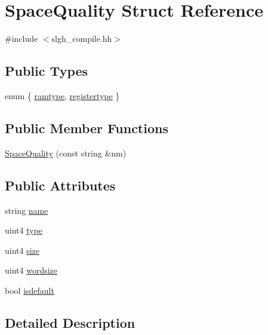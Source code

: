 \hypertarget{struct_space_quality}{}\section{Space\+Quality Struct Reference}
\label{struct_space_quality}


{\ttfamily \#include $<$slgh\+\_\+compile.\+hh$>$}

\subsection*{Public Types}
\begin{DoxyCompactItemize}
\item 
enum \{ \mbox{\hyperlink{struct_space_quality_aa71ecaac88b2aa42675c8d709b3919c4a8a2713d7c09dc831cb443d814abc03c5}{ramtype}}, 
\mbox{\hyperlink{struct_space_quality_aa71ecaac88b2aa42675c8d709b3919c4a743b3aa3a949eff694df8417dac50ed5}{registertype}}
 \}
\end{DoxyCompactItemize}
\subsection*{Public Member Functions}
\begin{DoxyCompactItemize}
\item 
\mbox{\hyperlink{struct_space_quality_ac5c528c46fa5a6d6c3d910ca6b792651}{Space\+Quality}} (const string \&nm)
\end{DoxyCompactItemize}
\subsection*{Public Attributes}
\begin{DoxyCompactItemize}
\item 
string \mbox{\hyperlink{struct_space_quality_a537fc899e2cd5e0a66bb0cf7d2505734}{name}}
\item 
uint4 \mbox{\hyperlink{struct_space_quality_a224d683b54fb55255b659856b569984f}{type}}
\item 
uint4 \mbox{\hyperlink{struct_space_quality_a3c569790ce295e87cf41dd8f1393c437}{size}}
\item 
uint4 \mbox{\hyperlink{struct_space_quality_af5ee1ab18c74388b5fb952f4187e912a}{wordsize}}
\item 
bool \mbox{\hyperlink{struct_space_quality_ae2719ff148b6dd3255be4dd09fecb1f0}{isdefault}}
\end{DoxyCompactItemize}


\subsection{Detailed Description}


